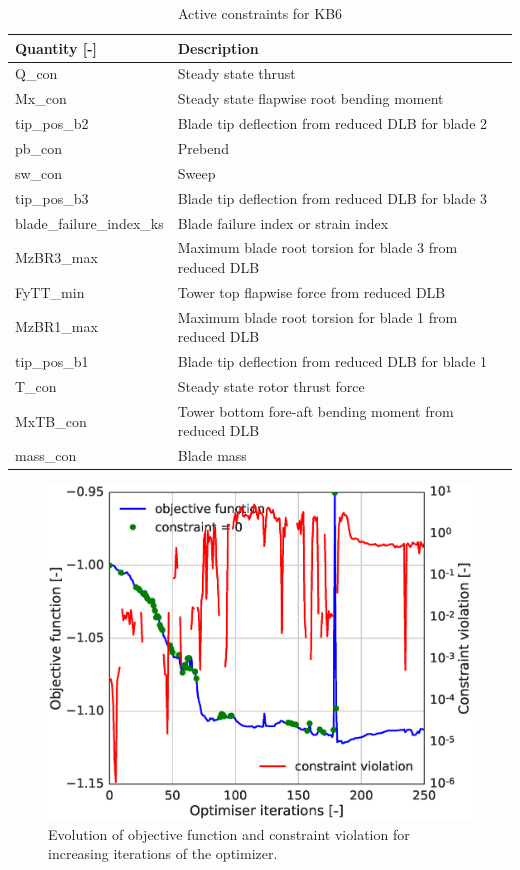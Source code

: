 \begin{table}[!ht]
\centering
\caption{Active constraints for KB6}
\label{tab:KB6_cons}
\begin{tabular}{|l|l|}
\hline
 Quantity [-]             & Description           \\
\hline
Q\_con                    &  Steady state thrust  \\
Mx\_con                   &  Steady state flapwise root bending moment    \\
tip\_pos\_b2              &  Blade tip deflection from reduced DLB for blade 2 \\
pb\_con                   &  Prebend    \\
sw\_con                   &  Sweep                  \\
tip\_pos\_b3              &  Blade tip deflection from reduced DLB for blade 3             \\
blade\_failure\_index\_ks &  Blade failure index or strain index  \\
MzBR3\_max                &  Maximum blade root torsion for blade 3 from reduced DLB \\
FyTT\_min                 &  Tower top flapwise force from reduced DLB\\
MzBR1\_max                &  Maximum blade root torsion for blade 1 from reduced DLB \\
tip\_pos\_b1              &  Blade tip deflection from reduced DLB for blade 1 \\
T\_con                    &  Steady state rotor thrust force \\
MxTB\_con                 &  Tower bottom fore-aft bending moment from reduced DLB\\
mass\_con                  &  Blade mass      \\
\hline
\end{tabular}
\end{table}

\begin{figure}[!ht]
\begin{center}
	\includegraphics[width=.85\linewidth]{figures/KB6_final/KB6_obj_cons_ipopt.eps}
\end{center}
\caption{Evolution of objective function and constraint violation for increasing iterations of the optimizer.}
\label{fig:KB6_objf}
\end{figure}

